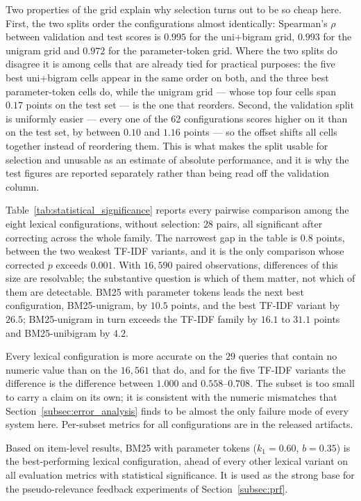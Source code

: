 \documentclass[preprint,review,12pt]{elsarticle}
\begin{document}
Two properties of the grid explain why selection turns out to be so cheap here. First, the two splits order the configurations almost identically: Spearman's $\rho$ between validation and test scores is $0.995$ for the uni+bigram grid, $0.993$ for the unigram grid and $0.972$ for the parameter-token grid. Where the two splits do disagree it is among cells that are already tied for practical purposes: the five best uni+bigram cells appear in the same order on both, and the three best parameter-token cells do, while the unigram grid --- whose top four cells span $0.17$ points on the test set --- is the one that reorders. Second, the validation split is uniformly easier --- every one of the 62 configurations scores higher on it than on the test set, by between $0.10$ and $1.16$ points --- so the offset shifts all cells together instead of reordering them. This is what makes the split usable for selection and unusable as an estimate of absolute performance, and it is why the test figures are reported separately rather than being read off the validation column.

Table~\ref{tab:statistical_significance} reports every pairwise comparison among the eight lexical configurations, without selection: $28$ pairs, all significant after correcting across the whole family. The narrowest gap in the table is $0.8$ points, between the two weakest TF-IDF variants, and it is the only comparison whose corrected $p$ exceeds $0.001$. With $16{,}590$ paired observations, differences of this size are resolvable; the substantive question is which of them matter, not which of them are detectable. BM25 with parameter tokens leads the next best configuration, BM25-unigram, by $10.5$ points, and the best TF-IDF variant by $26.5$; BM25-unigram in turn exceeds the TF-IDF family by $16.1$ to $31.1$ points and BM25-unibigram by $4.2$.



Every lexical configuration is more accurate on the $29$ queries that contain no numeric value than on the $16{,}561$ that do, and for the five TF-IDF variants the difference is the difference between $1.000$ and $0.558$--$0.708$. The subset is too small to carry a claim on its own; it is consistent with the numeric mismatches that Section~\ref{subsec:error_analysis} finds to be almost the only failure mode of every system here. Per-subset metrics for all configurations are in the released artifacts.



Based on item-level results, BM25 with parameter tokens ($k_1=0.60$, $b=0.35$) is the best-performing lexical configuration, ahead of every other lexical variant on all evaluation metrics with statistical significance. It is used as the strong base for the pseudo-relevance feedback experiments of Section~\ref{subsec:prf}.
\end{document}
